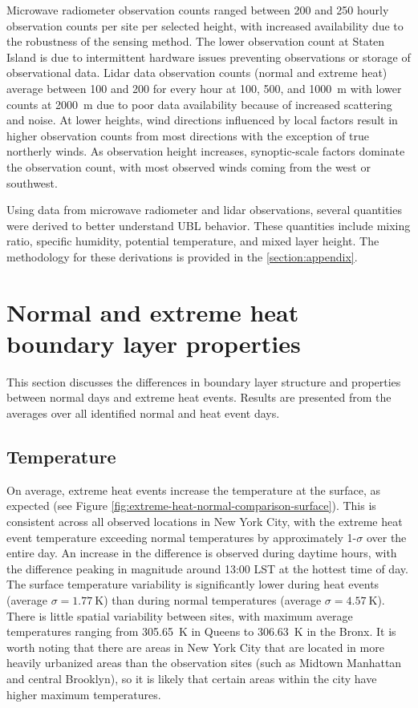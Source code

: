 Microwave radiometer observation counts ranged between 200 and 250 hourly observation counts per site per selected height, with increased availability due to the robustness of the sensing method. The lower observation count at Staten Island is due to intermittent hardware issues preventing observations or storage of observational data. Lidar data observation counts (normal and extreme heat) average between 100 and 200 for every hour at 100, 500, and \SI{1000}{\meter} with lower counts at \SI{2000}{\meter} due to poor data availability because of increased scattering and noise. At lower heights, wind directions influenced by local factors result in higher observation counts from most directions with the exception of true northerly winds. As observation height increases, synoptic-scale factors dominate the observation count, with most observed winds coming from the west or southwest.

Using data from microwave radiometer and lidar observations, several quantities were derived to better understand UBL behavior. These quantities include mixing ratio, specific humidity, potential temperature, and mixed layer height. The methodology for these derivations is provided in the \ref{section:appendix}.

\section{Normal and extreme heat boundary layer properties} \label{section:normal_extreme_properties}
This section discusses the differences in boundary layer structure and properties between normal days and extreme heat events. Results are presented from the averages over all identified normal and heat event days.

\subsection{Temperature}
On average, extreme heat events increase the temperature at the surface, as expected (see Figure \ref{fig:extreme-heat-normal-comparison-surface}). This is consistent across all observed locations in New York City, with the extreme heat event temperature exceeding normal temperatures by approximately 1-$\sigma$ over the entire day. An increase in the difference is observed during daytime hours, with the difference peaking in magnitude around 13:00 LST at the hottest time of day. The surface temperature variability is significantly lower during heat events (average $ \sigma = \SI{1.77}{\kelvin} $) than during normal temperatures (average $ \sigma = \SI{4.57}{\kelvin} $). There is little spatial variability between sites, with maximum average temperatures ranging from \SI{305.65}{\kelvin} in Queens to \SI{306.63}{\kelvin} in the Bronx. It is worth noting that there are areas in New York City that are located in more heavily urbanized areas than the observation sites (such as Midtown Manhattan and central Brooklyn), so it is likely that certain areas within the city have higher maximum temperatures. 

